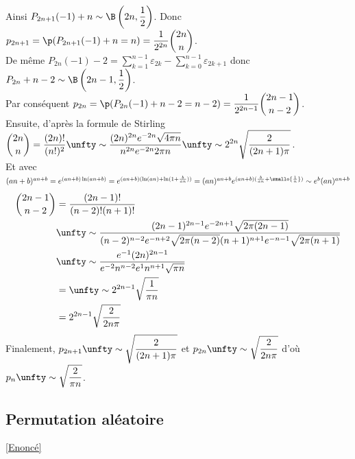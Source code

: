 \documentclass[8pt]{book}
\begin{document}
	Ainsi $P_{2n+1}(-1)+n\sim\B\left(2n,\dfrac{1}{2}\right)$. Donc $p_{2n+1}=\p(P_{2n+1}(-1)+n=n)=\displaystyle\frac{1}{2^{2n}}\binom{2n}{n}$.\\
	De même $P_{2n}(-1)-2=\displaystyle\sum_{k=1}^{n-1}\varepsilon_{2k}-\sum_{k=0}^{n-1}\varepsilon_{2k+1}$ donc $P_{2n}+n-2\sim\B\left(2n-1,\dfrac{1}{2}\right)$.\\
	Par conséquent $p_{2n}=\p(P_{2n}(-1)+n-2=n-2)=\displaystyle\frac{1}{2^{2n-1}}\binom{2n-1}{n-2}$.\\
	Ensuite, d'après la formule de Stirling $\displaystyle\binom{2n}{n}=\frac{(2n)!}{(n!)^2}\unfty\sim\frac{(2n)^{2n}e^{-2n}\sqrt{4\pi n}}{n^{2n}e^{-2n}2\pi n}\unfty\sim 2^{2n}\sqrt{\frac{2}{(2n+1)\pi}}$.\\
	Et avec $(an+b)^{an+b}=e^{(an+b)\ln(an+b)}=e^{(an+b)(\ln(an)+\ln(1+\frac{b}{an}))}=(an)^{an+b}e^{(an+b)(\frac{b}{an}+\smallo{\frac{1}{n}})}\sim e^b(an)^{an+b}$
	\begin{align*}
		\binom{2n-1}{n-2}&=\frac{(2n-1)!}{(n-2)!(n+1)!}\\
		&\unfty\sim\frac{(2n-1)^{2n-1}e^{-2n+1}\sqrt{2\pi(2n-1)}}{(n-2)^{n-2}e^{-n+2}\sqrt{2\pi(n-2)}(n+1)^{n+1}e^{-n-1}\sqrt{2\pi(n+1)}}\\
		&\unfty\sim\frac{e^{-1}(2n)^{2n-1}}{e^{-2}n^{n-2}e^1n^{n+1}\sqrt{\pi n}}\\
		&=\unfty\sim 2^{2n-1}\sqrt{\frac{1}{\pi n}}\\
		&=2^{2n-1}\sqrt{\frac{2}{2n\pi}}
	\end{align*}
	Finalement, $p_{2n+1}\unfty\sim\displaystyle\sqrt{\frac{2}{(2n+1)\pi}}$ et $p_{2n}\unfty\sim\displaystyle\sqrt{\frac{2}{2n\pi}}$ d'où $p_n\unfty\sim\displaystyle\sqrt{\frac{2}{\pi n}}$.
	
	\subsection{Permutation aléatoire}
	\label{Permutation aléatoire corrigé}
	\textcolor{blue}{\hyperref[Permutation aléatoire]{[Enoncé]}}\\
	
\end{document}
